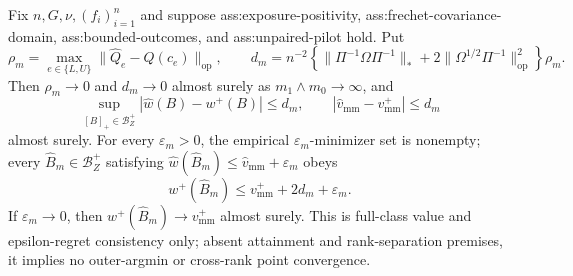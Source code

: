 Fix \(n,G,\nu,(f_i)_{i=1}^n\) and suppose ass:exposure-positivity, ass:frechet-covariance-domain, ass:bounded-outcomes, and ass:unpaired-pilot hold.  Put
\[
\rho_m=\max_{e\in\{L,U\}}\lVert\widehat Q_e-Q(c_e)\rVert_{\mathrm{op}},
\qquad
d_m=n^{-2}\!\left\{\lVert\Pi^{-1}\Omega\Pi^{-1}\rVert_*+2\lVert\Omega^{1/2}\Pi^{-1}\rVert_{\mathrm{op}}^2\right\}\rho_m.
\]
Then \(\rho_m\to0\) and \(d_m\to0\) almost surely as \(m_1\wedge m_0\to\infty\), and
\[
\sup_{[B]_+\in\mathcal B_Z^+}|\widehat w(B)-w^+(B)|\le d_m,
\qquad
|\widehat v_{\mathrm{mm}}-v_{\mathrm{mm}}^+|\le d_m
\]
almost surely.  For every \(\varepsilon_m>0\), the empirical \(\varepsilon_m\)-minimizer set is nonempty; every \(\widehat B_m\in\mathcal B_Z^+\) satisfying \(\widehat w(\widehat B_m)\le\widehat v_{\mathrm{mm}}+\varepsilon_m\) obeys
\[
w^+(\widehat B_m)\le v_{\mathrm{mm}}^++2d_m+\varepsilon_m.
\]
If \(\varepsilon_m\to0\), then \(w^+(\widehat B_m)\to v_{\mathrm{mm}}^+\) almost surely.  This is full-class value and epsilon-regret consistency only; absent attainment and rank-separation premises, it implies no outer-argmin or cross-rank point convergence.